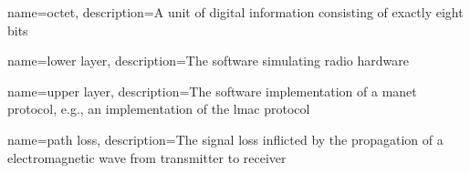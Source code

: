 {
    name={octet},
    description={A unit of digital information consisting of exactly eight bits}
}

{
    name={lower layer},
    description={The software simulating radio hardware}
}

{
    name={upper layer},
    description={The software implementation of a \acrshort{manet} protocol, e.g., an implementation of the \acrshort{lmac} protocol}
}

{
    name={path loss},
    description={The signal loss inflicted by the propagation of a electromagnetic wave from transmitter to receiver~\cite[p.~10]{paper:linkmodel}}
}